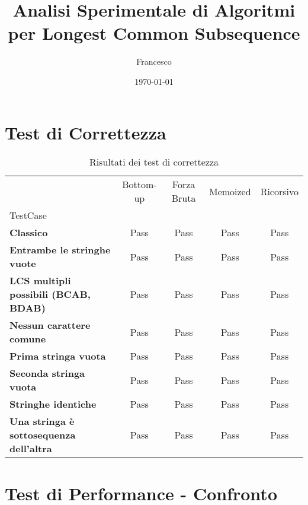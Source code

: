 \documentclass[a4paper, 11pt]{article}
\title{Analisi Sperimentale di Algoritmi per Longest Common Subsequence}
\author{Francesco}
\date{\today}
\begin{document}
\maketitle
\tableofcontents
\newpage

\section{Test di Correttezza}
\begin{center}
\begin{table}[H]
\caption{Risultati dei test di correttezza}
\label{tab:correttezza_risultati}
\begin{tabular}{l|c|c|c|c}
\toprule
 & Bottom-up & Forza Bruta & Memoized & Ricorsivo \\
TestCase &  &  &  &  \\
\midrule
\textbf{Classico} & Pass & Pass & Pass & Pass \\
\textbf{Entrambe le stringhe vuote} & Pass & Pass & Pass & Pass \\
\textbf{LCS multipli possibili (BCAB, BDAB)} & Pass & Pass & Pass & Pass \\
\textbf{Nessun carattere comune} & Pass & Pass & Pass & Pass \\
\textbf{Prima stringa vuota} & Pass & Pass & Pass & Pass \\
\textbf{Seconda stringa vuota} & Pass & Pass & Pass & Pass \\
\textbf{Stringhe identiche} & Pass & Pass & Pass & Pass \\
\textbf{Una stringa è sottosequenza dell'altra} & Pass & Pass & Pass & Pass \\
\bottomrule
\end{tabular}
\end{table}
\end{center}


\section{Test di Performance - Confronto}
\end{document}
